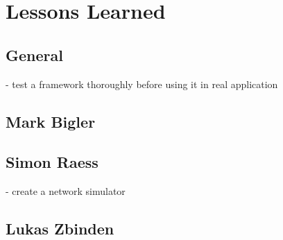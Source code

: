 \chapter{Lessons Learned}
\label{chapter:lessonslearned}



\section{General}

- test a framework thoroughly before using it in real application


\section{Mark Bigler}


\section{Simon Raess}

- create a network simulator


\section{Lukas Zbinden}


